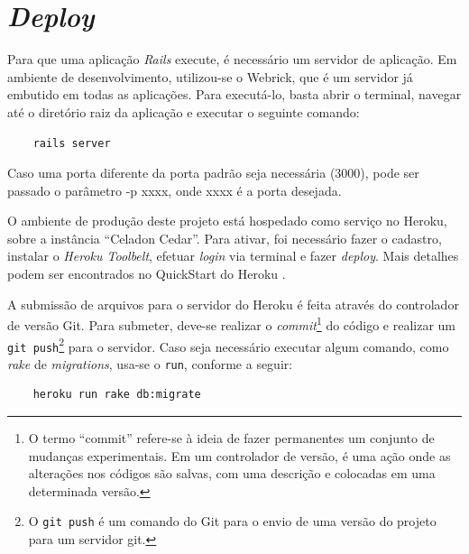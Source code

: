      
     
    \section{\emph{Deploy}}
            Para que uma aplicação \emph{Rails} execute, é necessário um servidor de aplicação. Em ambiente de desenvolvimento, utilizou-se o Webrick, que é um servidor já embutido em todas as aplicações. Para executá-lo, basta abrir o terminal, navegar até o diretório raiz da aplicação e executar o seguinte comando:
			
	\begin{lstlisting}		
    rails server
     \end{lstlisting}
	 
            Caso uma porta diferente da porta padrão seja necessária (3000), pode ser passado o parâmetro -p xxxx, onde xxxx é a porta desejada.
			
            O ambiente de produção deste projeto está hospedado como serviço no Heroku, sobre a instância ``Celadon Cedar''. Para ativar, foi necessário fazer o cadastro, instalar o \emph{Heroku Toolbelt}, efetuar \emph{login} via terminal e fazer \emph{deploy}. Mais detalhes podem ser encontrados no QuickStart do Heroku \cite{quickheroku}.
			
            A submissão de arquivos para o servidor do Heroku é feita através do controlador de versão Git. Para submeter, deve-se realizar o \emph{commit}\footnote{O termo ``commit'' refere-se à ideia de fazer permanentes um conjunto de mudanças experimentais. Em um controlador de versão, é uma ação onde as alterações nos códigos são salvas, com uma descrição e colocadas em uma determinada versão.} do código e realizar um \texttt{git push}\footnote{O \texttt{git push} é um comando do Git para o envio de uma versão do projeto para um servidor git.} para o servidor. Caso seja necessário executar algum comando, como \emph{rake} de \emph{migrations}, usa-se o \texttt{run}, conforme a seguir:
			
\begin{lstlisting}	
    heroku run rake db:migrate 
\end{lstlisting}